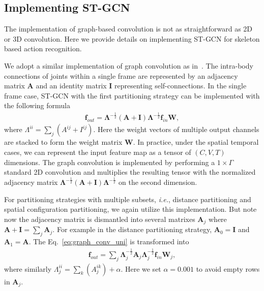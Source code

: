 \documentclass[letterpaper]{article} \usepackage{aaai18}  \usepackage{times}  \usepackage{helvet}  \usepackage{courier}  \usepackage{url}  \usepackage{graphicx}
\begin{document}
\subsection{Implementing ST-GCN}
The implementation of graph-based convolution is not as straightforward as 2D or 3D convolution. 
Here we provide details on implementing ST-GCN for skeleton based action recognition.

We adopt a similar implementation of graph convolution as in~\cite{Kipf2017ICLR}.
The intra-body connections of joints within a single frame are represented by an adjacency matrix $ \mathbf{A} $ and an identity matrix $ \mathbf{I} $ representing self-connections.
In the single frame case, ST-GCN with the first partitioning strategy can be implemented with the following formula~\cite{Kipf2017ICLR}
\begin{align}\label{eq:graph_conv_uni}
	\mathbf{f}_{out} = \mathbf{\Lambda}^{-\frac{1}{2}}(\mathbf{A} + \mathbf{I})\mathbf{\Lambda}^{-\frac{1}{2}}\mathbf{f}_{in}\mathbf{W},
\end{align}
where $ \Lambda^{ii} = \sum_j(A^{ij} + I^{ij}) $.
Here the weight vectors of multiple output channels are stacked to form the weight matrix $ \mathbf{W} $.
In practice, under the spatial temporal cases, we can represent the input feature map as a tensor of $(C, V, T)$ dimensions.
The graph convolution is implemented by performing a $ 1\times \Gamma $ standard 2D convolution and multiplies the resulting tensor with the normalized adjacency matrix $ \mathbf{\Lambda}^{-\frac{1}{2}}(\mathbf{A} + \mathbf{I})\mathbf{\Lambda}^{-\frac{1}{2}} $ on the second dimension.

For partitioning strategies with multiple subsets, \emph{i.e.}, distance partitioning and spatial configuration partitioning, we again utilize this implementation. 
But note now the adjacency matrix is dismantled into several matrixes $ \mathbf{A}_j $ where $ \mathbf{A} + \mathbf{I} = \sum_j \mathbf{A}_j $.
For example in the distance partitioning strategy, $ \mathbf{A}_0 = \mathbf{I} $ and $ \mathbf{A}_1 = \mathbf{\mathbf{A}} $. 
The Eq.~\ref{eq:graph_conv_uni} is transformed into
\begin{align}\label{eq:graph_conv_part}
	\mathbf{f}_{out} = \sum_j \mathbf{\Lambda}_j^{-\frac{1}{2}}\mathbf{A}_j\mathbf{\Lambda}_j^{-\frac{1}{2}}\mathbf{f}_{in}\mathbf{W}_j,
\end{align}
where similarly $ \Lambda^{ii}_j = \sum_k(A^{ik}_j) + \alpha$. 
Here we set $ \alpha = 0.001 $ to avoid empty rows in $ \mathbf{A}_j $.
\end{document}
